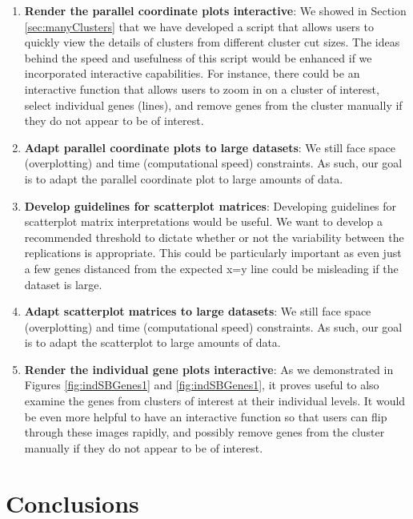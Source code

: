 \documentclass[11pt,a4paper,oldfontcommands,openany]{memoir}
\numberwithin{equation}{section} %
\begin{document}
\begin{enumerate}
\item \textbf{Render the parallel coordinate plots interactive}: We showed in Section \ref{sec:manyClusters} that we have developed a script that allows users to quickly view the details of clusters from different cluster cut sizes. The ideas behind the speed and usefulness of this script would be enhanced if we incorporated interactive capabilities. For instance, there could be an interactive function that allows users to zoom in on a cluster of interest, select individual genes (lines), and remove genes from the cluster manually if they do not appear to be of interest.

\item \textbf{Adapt parallel coordinate plots to large datasets}: We still face space (overplotting) and time (computational speed) constraints. As such, our goal is to adapt the parallel coordinate plot to large amounts of data.

\item \textbf{Develop guidelines for scatterplot matrices}: Developing guidelines for scatterplot matrix interpretations would be useful. We want to develop a recommended threshold to dictate whether or not the variability between the replications is appropriate. This could be particularly important as even just a few genes distanced from the expected x=y line could be misleading if the dataset is large.

\item \textbf{Adapt scatterplot matrices to large datasets}: We still face space (overplotting) and time (computational speed) constraints. As such, our goal is to adapt the scatterplot to large amounts of data.

\item \textbf{Render the individual gene plots interactive}: As we demonstrated in Figures \ref{fig:indSBGenes1} and \ref{fig:indSBGenes1}, it proves useful to also examine the genes from clusters of interest at their individual levels. It would be even more helpful to have an interactive function so that users can flip through these images rapidly, and possibly remove genes from the cluster manually if they do not appear to be of interest.

\end{enumerate}

\section{Conclusions}
\end{document}
